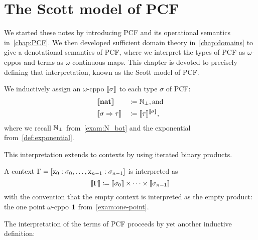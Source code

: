 \chapter{The Scott model of PCF}

We started these notes by introducing PCF and its operational semantics
in~\cref{chap:PCF}. We then developed sufficient domain theory
in~\cref{chap:domains} to give a denotational semantics of PCF, where we
interpret the types of PCF as \(\omega\)-cppos and terms as
\(\omega\)-continuous maps. This chapter is devoted to precisely defining that
interpretation, known as the Scott model of PCF.

\begin{definition}
  We inductively assign an \(\omega\)-cppo \(\llbracket\sigma\rrbracket\) to each type
  \(\sigma\) of PCF:
  \begin{alignat*}{3}
    &\llbracket\mathtt{\mathbf{nat}}\rrbracket &&\coloneqq \mathbb N_\bot, \text{and} \\
    &\llbracket\sigma \Rightarrow \tau\rrbracket &&\coloneqq \llbracket\tau\rrbracket^{\llbracket\sigma\rrbracket},
  \end{alignat*}
  where we recall \(\mathbb N_\bot\) from~\cref{exam:N_bot} and the exponential
  from~\cref{def:exponential}.
\end{definition}

This interpretation extends to contexts by using iterated binary products.
\begin{definition}
  A context
  \(\Gamma = [\mathtt x_0 : \sigma_0, \dots , \mathtt x_{n-1} :
  \sigma_{n-1}]\)
  is interpreted as
  \[
    \llbracket\Gamma\rrbracket \coloneqq \llbracket\sigma_0\rrbracket \times \cdots \times
    \llbracket\sigma_{n-1}\rrbracket
  \]
  with the convention that the empty context is interpreted as the empty
  product: the one point \(\omega\)-cppo \(\mathbf 1\) from~\cref{exam:one-point}.
\end{definition}

The interpretation of the terms of PCF proceeds by yet another inductive
definition:


